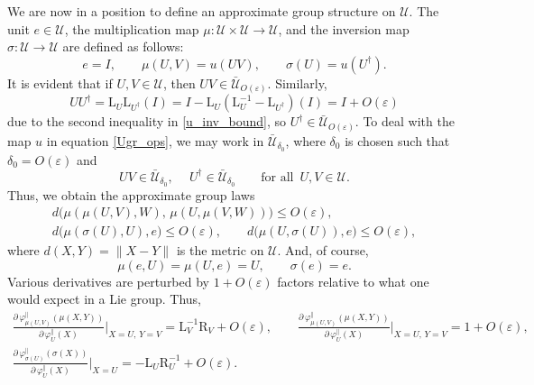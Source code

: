 \documentclass[12pt]{article}
\newcommand{\calU}{\mathcal{U}}
\newcommand{\La}{\mathrm{L}}
\newcommand{\Ra}{\mathrm{R}}
\newcommand{\eps}{\varepsilon}
\newcommand{\ph}{\varphi}
\renewcommand{\le}{\leqslant}
\newtheorem[definition]{Definition}[Theorem]{Definition}
\newtheorem[remark]{Example}[Theorem]{Example}
\newtheorem[remark]{Remark}[Theorem]{Remark}
\newtheorem[remark]{Question}[Theorem]{Open question}
\newtheorem*[definition]{definition}{Definition}
\newtheorem*[remark]{example}{Example}
\newtheorem*[remark]{remark}{Remark}
\newtheorem*[remark]{question}{Open question}
\numberwithin{equation}{section}
\begin{document}
We are now in a position to define an approximate group structure on $\calU$. The unit $e\in\calU$, the multiplication map $\mu\colon \calU\times\calU\to\calU$, and the inversion map $\sigma\colon \calU\to\calU$ are defined as follows:
\begin{equation}\label{Ugr_ops}
e=I,\qquad \mu(U,V) = u(UV),\qquad \sigma(U)=u(U^\dag).
\end{equation}
It is evident that if $U,V\in\calU$, then $UV\in\bar{\calU}_{O(\eps)}$. Similarly,
\[
UU^\dag =\La_U\La_{U^\dag}(I) =I-\La_U(\La_U^{-1}-\La_{U^\dag})(I)=I+O(\eps)
\]
due to the second inequality in \eqref{u_inv_bound}, so $U^\dag\in\bar{\calU}_{O(\eps)}$. To deal with the map $u$ in equation \eqref{Ugr_ops}, we may work in $\bar{\calU}_{\delta_0}$, where $\delta_0$ is chosen such that $\delta_0=O(\eps)$ and
\begin{equation}
UV\in\bar{\calU}_{\delta_0},\quad\: U^\dag\in\bar{\calU}_{\delta_0}\qquad
\text{for all }\, U,V\in\calU.
\end{equation}
Thus, we obtain the approximate group laws
\begin{gather}
d\bigl(\mu(\mu(U,V),W),\, \mu(U,\mu(V,W))\bigr)\le O(\eps),\\[2pt]
d\bigl(\mu(\sigma(U),U), e\bigr)\le O(\eps),\qquad
d\bigl(\mu(U,\sigma(U)), e\bigr)\le O(\eps),
\end{gather}
where $d(X,Y)=\|X-Y\|$ is the metric on $\calU$. And, of course,
\begin{equation}
\mu(e,U)=\mu(U,e)=U,\qquad \sigma(e)=e.
\end{equation}
Various derivatives are perturbed by $1+O(\eps)$ factors relative to what one would expect in a Lie group. Thus,
\begin{gather}
\label{der_gr_product}
\frac{\partial\,\ph_{\mu(U,V)}^\parallel(\mu(X,Y))}
{\partial\,\ph_U^\parallel(X)}
\bigg|_{X=U,\,Y=V} \!\!= \La_V^{-1}\Ra_V+O(\eps),\qquad
\frac{\partial\,\ph_{\mu(U,V)}^\parallel(\mu(X,Y))}
{\partial\,\ph_U^\parallel(X)}
\bigg|_{X=U,\,Y=V} \!\!= 1+O(\eps),\\[3pt]
\label{der_gr_inverse}
\frac{\partial\,\ph_{\sigma(U)}^\parallel(\sigma(X))}
{\partial\,\ph_U^\parallel(X)}
\bigg|_{X=U} \!= -\La_{U}\Ra_{U}^{-1}+O(\eps).
\end{gather}
\end{document}
